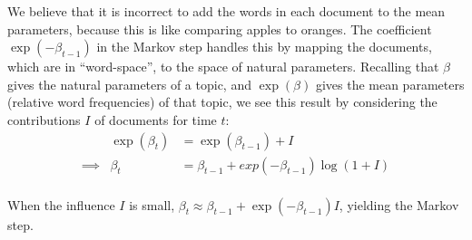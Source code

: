 We believe that it is incorrect to add the words in each
document to the mean parameters, because this is like comparing apples
to oranges.  The coefficient $\exp(-\beta_{t-1})$ in the Markov step
handles this by mapping the documents, which are in ``word-space'', to
the space of natural parameters.  Recalling that $\beta$ gives the
natural parameters of a topic, and $\exp(\beta)$ gives the mean parameters
(relative word frequencies) of that topic, we see this result by
considering the contributions $I$ of documents for time $t$:
\begin{eqnarray}
& \exp(\beta_t) & = \exp(\beta_{t-1}) + I \nonumber \\
 \implies & \beta_t & = \beta_{t-1} + exp(-\beta_{t-1}) \log(1 + I) \nonumber \\
\end{eqnarray}

  When the influence $I$ is small,
$\beta_t \approx \beta_{t-1} + \exp(-\beta_{t-1}) I$, yielding the Markov step.
